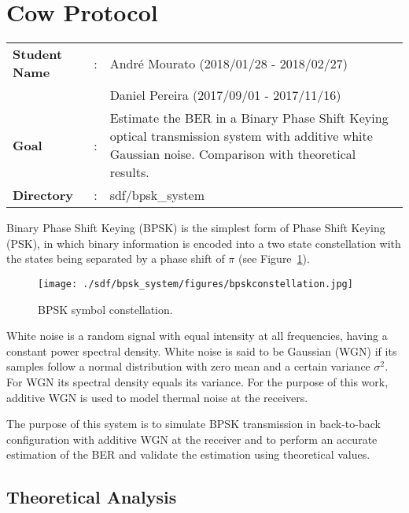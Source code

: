 \clearpage
\section{Cow Protocol}

\begin{refsection}

\begin{tcolorbox}	
\begin{tabular}{p{2.75cm} p{0.2cm} p{10.5cm}} 	
\textbf{Student Name}  &:&  Andr\'e Mourato (2018/01/28 - 2018/02/27)\\
\textbf{}  & &  Daniel Pereira (2017/09/01 - 2017/11/16)\\
\textbf{Goal}          &:& Estimate the BER in a Binary Phase Shift Keying optical transmission system with additive white Gaussian noise. Comparison with theoretical results.\\
\textbf{Directory}              &:& sdf/bpsk\_system
\end{tabular}
\end{tcolorbox}

Binary Phase Shift Keying (BPSK) is the simplest form of Phase Shift Keying (PSK), in which binary information is encoded into a two state constellation with the states being separated by a phase shift of $\pi$ (see Figure~\ref{fig:BPSKConst}).

\begin{figure}[h]
\centering
\texttt{[image: ./sdf/bpsk\_system/figures/bpskconstellation.jpg]}
\caption{BPSK symbol constellation.}
\label{fig:BPSKConst}
\end{figure}

\par
White noise is a random signal with equal intensity at all frequencies, having a constant power spectral density. White noise is said to be Gaussian (WGN) if its samples follow a normal distribution with zero mean and a certain variance $\sigma^2$. For WGN its spectral density equals its variance. For the purpose of this work, additive WGN is used to model thermal noise at the receivers.
\par
The purpose of this system is to simulate BPSK transmission in back-to-back configuration with additive WGN at the receiver and to perform an accurate estimation of the BER and validate the estimation using theoretical values.

\subsection{Theoretical Analysis}


\end{refsection}
